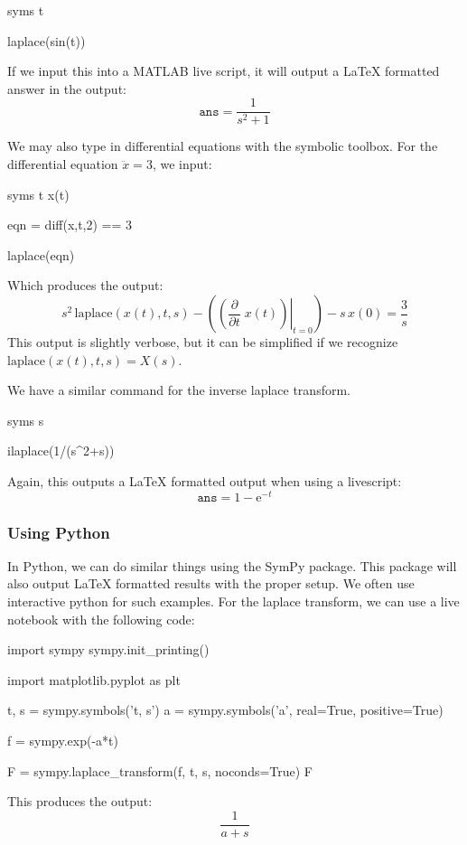 \begin{matlabscript}{}
syms t

laplace(sin(t))
\end{matlabscript}

If we input this into a MATLAB live script, it will output a LaTeX formatted answer in the output:
$$\texttt{ans}=\frac{1}{s^2+1}$$

We may also type in differential equations with the symbolic toolbox. For the differential equation $\ddot{x}=3$, we input:
\begin{matlabscript}{}
syms t x(t)

eqn = diff(x,t,2) == 3

laplace(eqn)
\end{matlabscript}
Which produces the output:
$$s^2 \,\mathrm{laplace}\left(x\left(t\right),t,s\right)-{\left({{\left(\frac{\partial }{\partial t}\;x\left(t\right)\right)}\left|\right.}_{t=0} \right)}-s\,x\left(0\right)=\frac{3}{s}$$
This output is slightly verbose, but it can be simplified if we recognize $\mathrm{laplace}\left(x\left(t\right),t,s\right)=X(s)$.

We have a similar command for the inverse \gls{laplace transform}.
\begin{matlabscript}{}
syms s

ilaplace(1/(s^2+s))
\end{matlabscript}
Again, this outputs a LaTeX formatted output when using a livescript:
$$\texttt{ans}=1-{\mathrm{e}}^{-t}$$

\subsubsection{Using Python}
In Python, we can do similar things using the SymPy package. This package will also output LaTeX formatted results with the proper setup. We often use interactive python for such examples. For the \gls{laplace transform}, we can use a live notebook with the following code:
\begin{pythonscript}{}
import sympy
sympy.init_printing()

import matplotlib.pyplot as plt

t, s = sympy.symbols('t, s')
a = sympy.symbols('a', real=True, positive=True)

f = sympy.exp(-a*t)

F = sympy.laplace_transform(f, t, s, noconds=True)
F
\end{pythonscript}

This produces the output:
$$\frac{1}{a+s}$$

